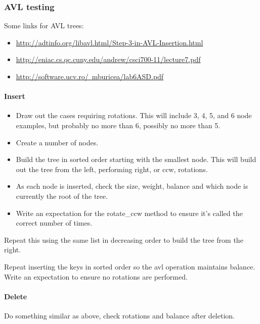 \documentclass{article}
\begin{document}
\subsubsection{AVL testing}

Some links for AVL trees:

\begin{itemize}
\item  \href{http://adtinfo.org/libavl.html/Step-3-in-AVL-Insertion.html}{%
http://adtinfo.org/libavl.html/Step-3-in-AVL-Insertion.html}
\item \href{http://eniac.cs.qc.cuny.edu/andrew/csci700-11/lecture7.pdf}{%
http://eniac.cs.qc.cuny.edu/andrew/csci700-11/lecture7.pdf}
\item \href{http://software.ucv.ro/~mburicea/lab6ASD.pdf}{%
http://software.ucv.ro/~mburicea/lab6ASD.pdf}
\end{itemize}

\paragraph{Insert}

\begin{itemize}
\item Draw out the cases requiring rotations. This will include 3, 4, 5, and 6
node examples, but probably no more than 6, possibly no more than 5.
\item Create a number of nodes.
\item Build the tree in sorted order starting with the smallest node.
This will build out the tree from the left, performing right, or ccw, rotations.
\item As each node is inserted, check the size, weight, balance and which node is currently the root of the tree.
\item Write an expectation for the rotate\_ccw method to ensure it's called the correct number of times.
\end{itemize}

Repeat this using the same list in decreasing order to build the tree from the
right.

Repeat inserting the keys in sorted order so the avl operation maintains
balance. Write an expectation to ensure no rotations are performed.


\paragraph{Delete}

Do something similar as above, check
rotations and balance after deletion.
\end{document}
